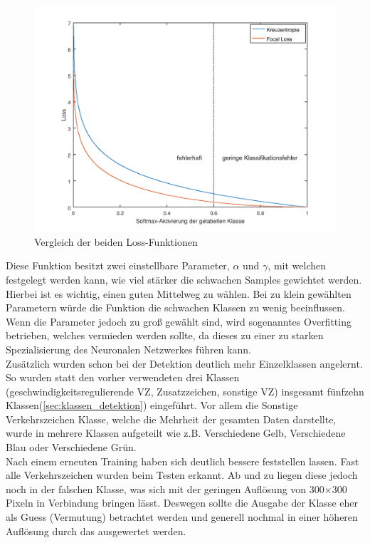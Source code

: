 \documentclass[12pt,a4paper,ngerman,enabledeprecatedfontcommands]{scrreprt}
\begin{document}
\begin{figure}[H]
\centering
\includegraphics[width=1\linewidth]{Grafiken/lossfunktionen.png}
\caption{Vergleich der beiden Loss-Funktionen}
\end{figure}

Diese Funktion besitzt zwei einstellbare Parameter, $\alpha$ und $\gamma$, mit welchen festgelegt werden kann, wie viel stärker die schwachen \gls{Sample}s gewichtet werden. Hierbei ist es wichtig, einen guten Mittelweg zu wählen. Bei zu klein gewählten Parametern würde die Funktion die schwachen Klassen zu wenig beeinflussen. Wenn die Parameter jedoch zu groß gewählt sind, wird sogenanntes \glqq{}Overfitting\grqq{} betrieben, welches vermieden werden sollte, da dieses zu einer zu starken Spezialisierung des Neuronalen Netzwerkes führen kann.\\


Zusätzlich wurden schon bei der Detektion deutlich mehr Einzelklassen angelernt. So wurden statt den vorher verwendeten drei Klassen (geschwindigkeitsregulierende \gls{VZ}, Zusatzzeichen, sonstige \gls{VZ}) insgesamt fünfzehn Klassen(\cref{sec:klassen_detektion})
eingeführt. Vor allem die \glqq{}Sonstige Verkehrszeichen\grqq{} Klasse, welche die Mehrheit der gesamten Daten darstellte, wurde in mehrere Klassen aufgeteilt wie z.B. \glqq{}Verschiedene Gelb\grqq{}, \glqq{}Verschiedene Blau\grqq{} oder \glqq{}Verschiedene Grün\grqq{}.\\
Nach einem erneuten Training haben sich deutlich bessere  feststellen lassen. Fast alle Verkehrszeichen wurden beim Testen erkannt. Ab und zu liegen diese jedoch noch in der falschen Klasse, was sich mit der geringen Auflösung von 300$\times$300 Pixeln in Verbindung bringen lässt. Deswegen sollte die Ausgabe der Klasse eher als \glqq{}Guess\grqq{} (Vermutung) betrachtet werden und generell nochmal in einer höheren Auflösung durch das  ausgewertet werden.\\
\end{document}

